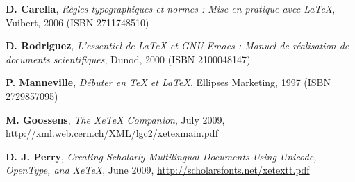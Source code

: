 \begin{thebibliography}{xx}
\textbf{D. Carella}, \textsl{Règles typographiques et normes : Mise en pratique avec {\LaTeX}}, Vuibert, 2006 (ISBN 2711748510)

\textbf{D. Rodriguez}, \textsl{L'essentiel de {\LaTeX} et GNU-Emacs : Manuel de réalisation de documents scientifiques}, Dunod, 2000 (ISBN 2100048147)

\textbf{P. Manneville}, \textsl{Débuter en {\TeX} et {LaTeX}}, Ellipses Marketing, 1997 (ISBN 2729857095)

\textbf{M. Goossens}, \textsl{The XeTeX Companion}, July 2009, \url{http://xml.web.cern.ch/XML/lgc2/xetexmain.pdf}

\textbf{D. J. Perry}, \textsl{Creating Scholarly Multilingual Documents Using Unicode, OpenType, and XeTeX}, June 2009, \url{http://scholarsfonts.net/xetextt.pdf}

\end{thebibliography}

\printindex
